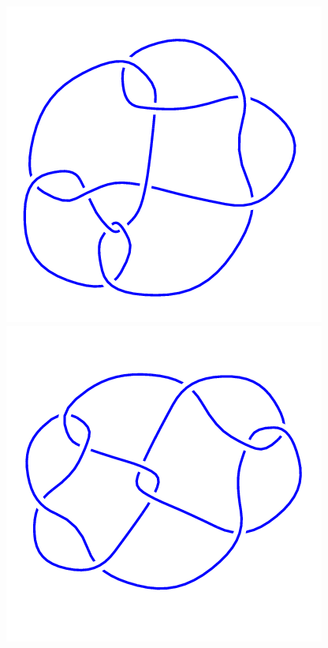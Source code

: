 \begin{figure}[H]
	\begin{minipage}[b]{.18\linewidth}
		\centering
		\includegraphics[width=\linewidth]{../data/10_57.png}
	\end{minipage}
	\begin{minipage}[b]{.18\linewidth}
		\centering
		\includegraphics[width=\linewidth]{../data/10_58.png}

\end{minipage}
\end{figure}
